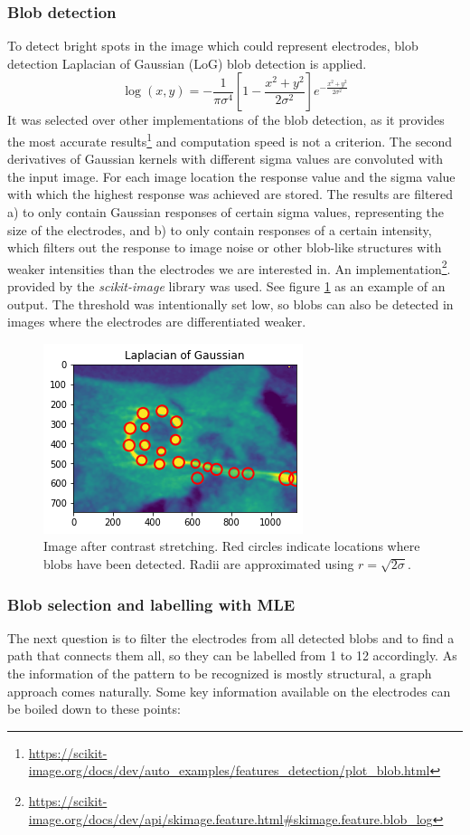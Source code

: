\documentclass[a4paper, 10pt, twocolumn]{article}
\begin{document}
\subsubsection{Blob detection}
To detect bright spots in the image which could represent electrodes, blob detection Laplacian of Gaussian (LoG) blob detection is applied.
$$
\log(x, y)=-\frac{1}{\pi \sigma^{4}}\left[1-\frac{x^{2}+y^{2}}{2 \sigma^{2}}\right] e^{-\frac{x^{2}+y^{2}}{2 \sigma^{2}}}
$$
It was selected over other implementations of the blob detection, as it provides the most accurate results\footnote{\url{https://scikit-image.org/docs/dev/auto_examples/features_detection/plot_blob.html}} and computation speed is not a criterion. The second derivatives of Gaussian kernels with different sigma values are convoluted with the input image. For each image location the response value and the sigma value with which the highest response was achieved are stored. The results are filtered a) to only contain Gaussian responses of certain sigma values, representing the size of the electrodes, and b) to only contain responses of a certain intensity, which filters out the response to image noise or other blob-like structures with weaker intensities than the electrodes we are interested in. An implementation\footnote{\url{https://scikit-image.org/docs/dev/api/skimage.feature.html#skimage.feature.blob_log}}.
provided by the \emph{scikit-image} \cite{scikit-image} library was used.
See figure \ref{blobs_detected} as an example of an output. The threshold was intentionally set low, so blobs can also be detected in images where the electrodes are differentiated weaker.

\begin{figure}[ht]
	\centering
  \includegraphics[width=.5\textwidth]{blobs_detected.png}
	\caption{Image after contrast stretching. Red circles indicate locations where blobs have been detected. Radii are approximated using $r=\sqrt{2 \sigma }$.}
	\label{blobs_detected}
\end{figure}


\subsubsection{Blob selection and labelling with MLE}
The next question is to filter the electrodes from all detected blobs and to find a path that connects them all, so they can be labelled from 1 to 12 accordingly.  
As the information of the pattern to be recognized is mostly structural, a graph approach comes naturally. Some key information available on the electrodes can be boiled down to these points:
\end{document}

